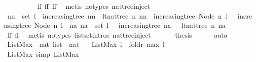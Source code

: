 \begin{isabellebody}
\ \ \ \ \ \ \ \ \isamarkupfalse%
\ ff{}\ ff{}\ ff{}\ \isamarkupfalse%
\ {\isacharparenleft}metis\ {\isacharparenleft}no{\isacharunderscore}types{\isacharparenright}\ nattree{\isachardot}inject{\isacharparenright}\ \isacommand{{\isacharbraceright}}\isamarkupfalse%
\isanewline
\ \ \ \ \isamarkupfalse%
\ \isamarkupfalse%
\ {\isachardoublequoteopen}{\isacharparenleft}nn\ {\isasymnotin}\ set\ l\ {\isasymor}\ increasing{\isacharunderscore}tree\ nn\ {\isasymand}\ lt{\isacharunderscore}nat{\isacharunderscore}tree\ n\ nn{\isacharparenright}\ {\isasymand}\ increasing{\isacharunderscore}tree\ {\isacharparenleft}Node\ n\ l{\isacharparenright}\ {\isasymor}\ {\isasymnot}\ increasing{\isacharunderscore}tree\ {\isacharparenleft}Node\ n\ l{\isacharparenright}\ {\isasymand}\ {\isacharparenleft}{\isasymexists}na{\isachardot}\ na\ {\isasymin}\ set\ l\ {\isasymand}\ {\isacharparenleft}{\isasymnot}\ increasing{\isacharunderscore}tree\ na\ {\isasymor}\ {\isasymnot}\ lt{\isacharunderscore}nat{\isacharunderscore}tree\ n\ na{\isacharparenright}{\isacharparenright}{\isachardoublequoteclose}\isanewline
\ \ \ \ \ \ \isamarkupfalse%
\ ff{}\ ff{}\ \isamarkupfalse%
\ {\isacharparenleft}metis\ {\isacharparenleft}no{\isacharunderscore}types{\isacharparenright}\ list{\isachardot}set{\isacharunderscore}intros{\isacharparenleft}{}{\isacharparenright}\ nattree{\isachardot}inject{\isacharparenright}\ \isacommand{{\isacharbraceright}}\isamarkupfalse%
\isanewline
\ \ \isamarkupfalse%
\ \isamarkupfalse%
\ {\isacharquery}thesis\isanewline
\ \ \ \ \isamarkupfalse%
\ auto\isanewline
{}\isamarkupfalse%
%
\endisatagproof
{\isafoldproof}%
%
\isadelimproof
\isanewline
%
\endisadelimproof
\isanewline
{}\isamarkupfalse%
\ ListMax\ {\isacharcolon}{\isacharcolon}\ {\isachardoublequoteopen}nat\ list\ {\isasymRightarrow}\ nat{\isachardoublequoteclose}\ \isanewline
\ \ {\isachardoublequoteopen}ListMax\ l\ {\isacharequal}\ foldr\ max\ l\ {}{\isachardoublequoteclose}\isanewline
\isanewline
{}\isamarkupfalse%
\ ListMax{\isacharunderscore}{}\ {\isacharbrackleft}simp{\isacharbrackright}{\isacharcolon}\ {\isachardoublequoteopen}ListMax\ {\isacharbrackleft}{\isacharbrackright}\ {\isacharequal}\ {}{\isachardoublequoteclose}\isanewline
%
\isadelimproof
\ \ %
\endisadelimproof
%
\isatagproof
{}\isamarkupfalse%

\end{isabellebody}

